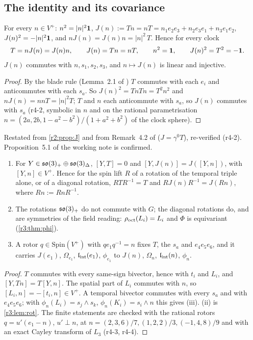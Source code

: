 \subsection{The identity and its covariance}
\label{r4:sec:identity}

\begin{proposition}
\label{r4:prop:identity}
For every $n\in V^+$: $n^2=|n|^2\mathbf 1$, $J(n):=Tn=nT=n_1e_2e_3+n_2e_3e_1+n_3e_1e_2$, $J(n)^2=-|n|^2\mathbf 1$, and $nJ(n)=J(n)n=|n|^2\,T$. Hence for every clock
\[
T=nJ(n)=J(n)n,\qquad J(n)=Tn=nT,\qquad n^2=\mathbf 1,\qquad J(n)^2=T^2=-\mathbf 1 .
\]
$J(n)$ commutes with $n,s_1,s_2,s_3$, and $n\mapsto J(n)$ is linear and injective.
\end{proposition}

\begin{proof}
By the blade rule (Lemma~2.1 of \cite{ES17}) $T$ commutes with each $e_i$ and anticommutes with each $s_a$. So $J(n)^2=TnTn=T^2n^2$ and
$nJ(n)=nnT=|n|^2T$; $T$ and $n$ each anticommute with $s_a$, so $J(n)$ commutes with $s_a$ (r4-2, symbolic in $n$ and on the rational parametrisation
$n=(2a,2b,1-a^2-b^2)/(1+a^2+b^2)$ of the clock sphere).
\end{proof}

Restated from \cref{r2:prop:J} and from Remark~4.2 of \cite{ES17} ($J=\gamma^0T$), re-verified (r4-2). Proposition~5.1 of the working note \cite{FMB} is
confirmed.

\begin{proposition}[Rotations]
\label{r4:prop:rot}
\begin{enumerate}[label=(\roman*),leftmargin=2.2em]
\item For $Y\in\mathfrak{so}(3)_+\oplus\mathfrak{so}(3)_\Delta$, $[Y,T]=0$ and $[Y,J(n)]=J([Y,n])$, with $[Y,n]\in V^+$. Hence for the spin lift $R$ of a rotation of the temporal
triple alone, or of a diagonal rotation, $RTR^{-1}=T$ and $RJ(n)R^{-1}=J(Rn)$, where $Rn:=RnR^{-1}$.
\item The rotations $\mathfrak{so}(3)_+$ do not commute with $G$; the diagonal rotations do, and are symmetries of the field reading: $\rho_{\rm oct}(L_i)=L_i$
and $\Phi$ is equivariant (\cref{r3:thm:phi}).
\item A rotor $q\in\mathrm{Spin}(V^+)$ with $qe_1q^{-1}=n$ fixes $T$, the $s_a$ and $e_4e_5e_6$, and it carries $J(e_1)$, $\Omega_{e_1}$, $\mathfrak l_{\rm int}(e_1)$,
$\phi_{e_1}$ to $J(n)$, $\Omega_n$, $\mathfrak l_{\rm int}(n)$, $\phi_n$.
\end{enumerate}
\end{proposition}

\begin{proof}
$T$ commutes with every same-sign bivector, hence with $t_i$ and $L_i$, and $[Y,Tn]=T[Y,n]$. The spatial part of $L_i$ commutes with $n$, so
$[L_i,n]=-[t_i,n]\in V^+$. A temporal bivector commutes with every $s_a$ and with $e_4e_5e_6$; with $\phi_n(L_i)=s_j\wedge s_k$, $\phi_n(K_i)=s_i\wedge n$ this
gives (iii). (ii) is \cref{r3:lem:rot}. The finite statements are checked with the rational rotors $q=u'(e_1-n)$, $u'\perp n$, at
$n=(2,3,6)/7,(1,2,2)/3,(-1,4,8)/9$ and with an exact Cayley transform of $L_3$ (r4-3, r4-4).
\end{proof}


